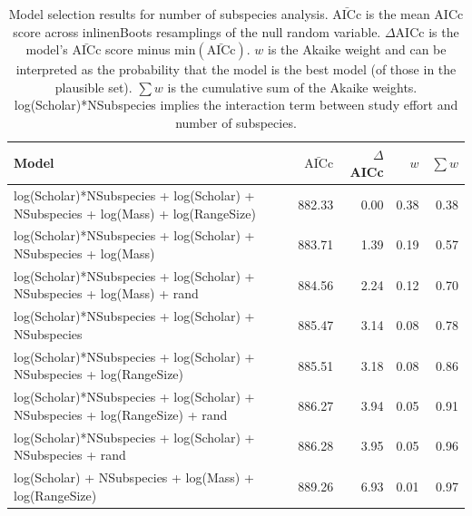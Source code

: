 











\begin{landscape}
\begin{table}[ht]
\centering
\caption{
  Model selection results for number of subspecies analysis. 
  $\bar{\text{AICc}}$ is the mean AICc score across 
inline{nBoots} resamplings of the null random variable. 
  $\Delta$AICc is the model's $\bar{\text{AICc}}$ score minus $\text{min}(\bar{\text{AICc}})$. 
  $w$ is the Akaike weight and can be interpreted as the probability that the model is the best model (of those in the plausible set).
  $\sum w$ is the cumulative sum of the Akaike weights.
  log(Scholar)*NSubspecies implies the interaction term between study effort and number of subspecies.
  } 
\label{A-modelWeights}
\begingroup\tiny
\begin{tabular}{@{}lrrrr@{}}
  \toprule
Model & $\bar{\text{AICc}}$ & $\Delta$AICc & $w$ & $\sum w$ \\ 
  \midrule
log(Scholar)*NSubspecies + log(Scholar) + NSubspecies + log(Mass) + log(RangeSize) & 882.33 & 0.00 & 0.38 & 0.38 \\ 
  log(Scholar)*NSubspecies + log(Scholar) + NSubspecies + log(Mass) & 883.71 & 1.39 & 0.19 & 0.57 \\ 
  log(Scholar)*NSubspecies + log(Scholar) + NSubspecies + log(Mass) + rand & 884.56 & 2.24 & 0.12 & 0.70 \\ 
  log(Scholar)*NSubspecies + log(Scholar) + NSubspecies & 885.47 & 3.14 & 0.08 & 0.78 \\ 
  log(Scholar)*NSubspecies + log(Scholar) + NSubspecies + log(RangeSize) & 885.51 & 3.18 & 0.08 & 0.86 \\ 
  log(Scholar)*NSubspecies + log(Scholar) + NSubspecies + log(RangeSize) + rand & 886.27 & 3.94 & 0.05 & 0.91 \\ 
  log(Scholar)*NSubspecies + log(Scholar) + NSubspecies + rand & 886.28 & 3.95 & 0.05 & 0.96 \\ 
  log(Scholar) + NSubspecies + log(Mass) + log(RangeSize) & 889.26 & 6.93 & 0.01 & 0.97 \\ 

\end{tabular}
\end{table}
\end{landscape}
